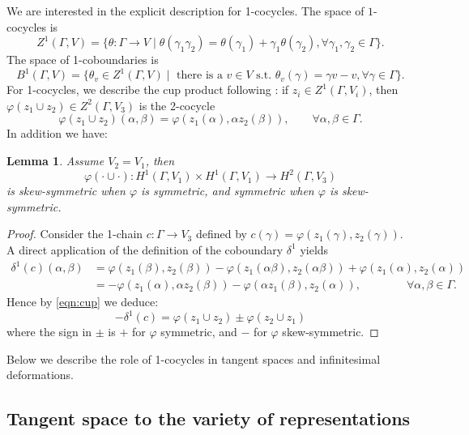 \documentclass[a4paper,11pt]{article}
\newtheorem{Lemma}[Theorem]{Lemma}
\begin{document}
 
 
We are  interested in the explicit description for  1-cocycles. 
The space of $1$-cocycles is 
$$
Z^1(\Gamma, V)= \{\theta\colon \Gamma\to V\mid \theta(\gamma_1\gamma_2)=\theta(\gamma_1)+\gamma_1\theta(\gamma_2), 
\forall \gamma_1,\gamma_2\in \Gamma\}.
$$
The space of 1-coboundaries is
$$
B^1(\Gamma, V)= \{\theta_v \in  Z^1(\Gamma, V)\mid \textrm{ there is a }v\in V\textrm{ s.t. } 
\theta_v(\gamma)= \gamma v - v,\forall\gamma\in\Gamma\}  .
$$
%
For 1-cocycles, we describe the cup product 
following \cite{Brown}:
if $z_i\in Z^1(\Gamma, V_i)$, then $
\varphi(z_1\cup z_2)\in Z^2(\Gamma, V_3)
$ 
is the 2-cocycle
\begin{equation}
\label{eqn:cup}
\varphi(z_1\cup z_2)(\alpha,\beta)= \varphi(z_1(\alpha), \alpha z_2(\beta)),\qquad
\forall \alpha,\beta\in\Gamma.
\end{equation}
In addition we have:

\begin{Lemma} 
\label{lemma:symmetry}
Assume $V_2=V_1$, 
then $$
\varphi(\cdot\cup \cdot)\colon H^1(\Gamma, V_1)\times H^1(\Gamma, V_1)\to H^2(\Gamma, V_3)
$$ 
is skew-symmetric when $\varphi$ is symmetric, and 
symmetric when  $\varphi$ is skew-symmetric. 
\end{Lemma}

\begin{proof}
Consider the 1-chain $c\colon\Gamma\to V_3$ defined by $c(\gamma)=\varphi(z_1(\gamma),  z_2(\gamma))$. 
A direct application of the definition of the coboundary $\delta^1$
yields 
\begin{align*}
\delta^1(c)(\alpha, \beta)& = \varphi(z_1(\beta),  z_2(\beta)) - \varphi(z_1(\alpha\beta ),   z_2(\alpha\beta))
+ \varphi(z_1(\alpha),  z_2(\alpha)) \\
&= -\varphi(z_1(\alpha), \alpha z_2(\beta))
-\varphi(\alpha z_1(\beta),  z_2(\alpha)), \qquad \qquad \forall \alpha, \beta\in \Gamma .
\end{align*}
% 
Hence by \eqref{eqn:cup} we deduce: 
$$-\delta^1(c)=  \varphi(z_1\cup z_2)\pm  \varphi(z_2\cup z_1) $$
where the sign in $\pm$ is $+$ for $\varphi$ symmetric, and $-$ for 
$\varphi$ skew-symmetric.
 \end{proof}




Below we describe the role of 1-cocycles in tangent spaces and infinitesimal deformations.
 



\subsection{Tangent space to the variety of representations}
\end{document}
